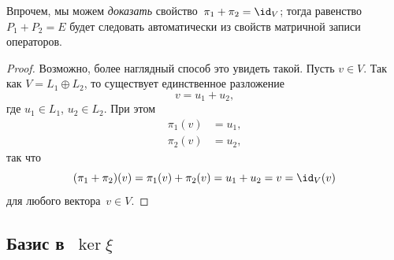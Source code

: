 \begin{solution}
	\begin{remark}
		Впрочем, мы можем \emph{доказать} свойство~$\pi_1 + \pi_2 = \id_V$; тогда равенство~$P_1 + P_2 = E$ будет следовать автоматически из свойств матричной записи операторов.
	\end{remark}
	\begin{proof}
		Возможно, более наглядный способ это увидеть такой.
		Пусть $v \in V$. Так как $V = L_1 \oplus L_2$, то существует единственное разложение
		\[
			v = u_1 + u_2,
		\]
		где $u_1 \in L_1$, $u_2 \in L_2$. При этом
		\begin{align*}
			\pi_1(v) &= u_1,
			\\
			\pi_2(v) &= u_2,
		\end{align*}
		так что
		\[
			(\pi_1 + \pi_2)(v) =
			\pi_1(v) + \pi_2(v) =
			u_1 + u_2 = v =
			\id_V (v)
		\]
		для любого вектора~$v \in V$. 
	\end{proof}


	\subsection[Базис в~$\ker{\xi}$]{Базис в~$\ker{\xi}$}


\end{solution}
